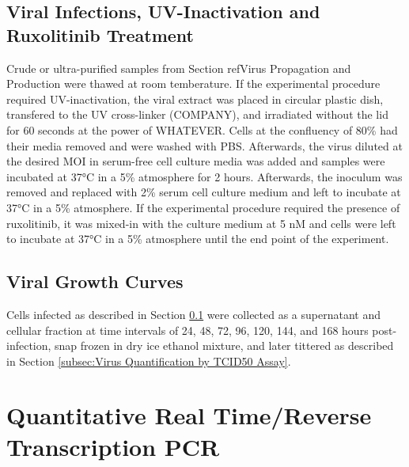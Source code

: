 \subsection{Viral Infections, UV-Inactivation and Ruxolitinib Treatment} \label{subsec:Viral Infections, UV-Inactivation and Ruxolitinib Treatment}
Crude or ultra-purified samples from Section ref{Virus Propagation and Production} were thawed at room temberature. If the experimental procedure required UV-inactivation, the viral extract was placed in circular plastic dish, transfered to the UV cross-linker (COMPANY), and irradiated without the lid for 60 seconds at the power of WHATEVER. Cells at the confluency of 80\% had their media removed and were washed with PBS. Afterwards, the virus diluted at the desired MOI in serum-free cell culture media was added and samples were incubated at 37°C in a 5\%  atmosphere for 2 hours. Afterwards, the inoculum was removed and replaced with 2\% serum cell culture medium and left to incubate at 37°C in a 5\%  atmosphere. If the experimental procedure required the presence of ruxolitinib, it was mixed-in with the culture medium at 5 nM and cells were left to incubate at 37°C in a 5\%  atmosphere until the end point of the experiment.

\subsection{Viral Growth Curves} \label{subsec:Viral Growth Curves}
Cells infected as described in Section \ref{subsec:Viral Infections, UV-Inactivation and Ruxolitinib Treatment} were collected as a supernatant and cellular fraction at time intervals of 24, 48, 72, 96, 120, 144, and 168 hours post-infection, snap frozen in dry ice ethanol mixture, and later tittered as described in Section \ref{subsec:Virus Quantification by TCID50 Assay}.

\section{Quantitative Real Time/Reverse Transcription PCR} \label{sec:Quantitative Real Time/Reverse Transcription PCR}

